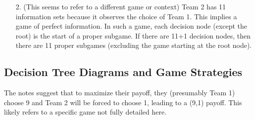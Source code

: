 \begin{enumerate}
    \item[2.] (This seems to refer to a different game or context) Team 2 has 11 information sets because it observes the choice of Team 1. This implies a game of perfect information. In such a game, each decision node (except the root) is the start of a proper subgame. If there are 11+1 decision nodes, then there are 11 proper subgames (excluding the game starting at the root node).
\end{enumerate}

\subsection*{Decision Tree Diagrams and Game Strategies}
The notes suggest that to maximize their payoff, they (presumably Team 1) choose 9 and Team 2 will be forced to choose 1, leading to a (9,1) payoff. This likely refers to a specific game not fully detailed here.

